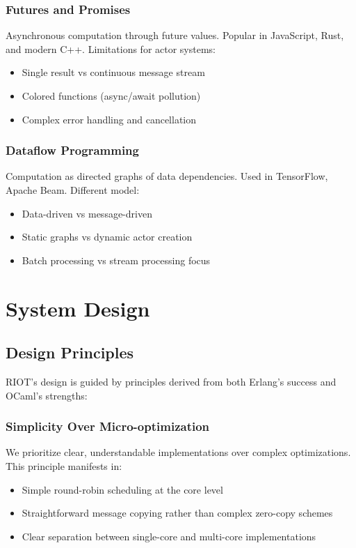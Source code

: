 \documentclass[12pt,a4paper]{report}
\begin{document}
\subsection{Futures and Promises}
Asynchronous computation through future values. Popular in JavaScript, Rust, and modern C++. Limitations for actor systems:
\begin{itemize}
\item Single result vs continuous message stream
\item Colored functions (async/await pollution)
\item Complex error handling and cancellation
\end{itemize}

\subsection{Dataflow Programming}
Computation as directed graphs of data dependencies. Used in TensorFlow, Apache Beam. Different model:
\begin{itemize}
\item Data-driven vs message-driven
\item Static graphs vs dynamic actor creation
\item Batch processing vs stream processing focus
\end{itemize}

\chapter{System Design}

\section{Design Principles}

RIOT's design is guided by principles derived from both Erlang's success and OCaml's strengths:

\subsection{Simplicity Over Micro-optimization}
We prioritize clear, understandable implementations over complex optimizations. This principle manifests in:
\begin{itemize}
\item Simple round-robin scheduling at the core level
\item Straightforward message copying rather than complex zero-copy schemes
\item Clear separation between single-core and multi-core implementations
\end{itemize}
\end{document}

